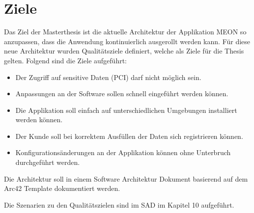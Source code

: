 \chapter{Ziele}

Das Ziel der Masterthesis ist die aktuelle Architektur der Applikation MEON so anzupassen, dass die Anwendung kontinuierlich ausgerollt werden kann. Für diese neue Architektur wurden Qualitätsziele definiert, welche als Ziele für die Thesis gelten. Folgend sind die Ziele aufgeführt:

\begin{itemize}
	\item Der Zugriff auf sensitive Daten (PCI) darf nicht möglich sein.
	\item Anpassungen an der Software sollen schnell eingeführt werden können.
	\item Die Applikation soll einfach auf unterschiedlichen Umgebungen installiert werden können.
	\item Der Kunde soll bei korrektem Ausfüllen der Daten sich registrieren können.
	\item Konfigurationsänderungen an der Applikation können ohne Unterbruch durchgeführt werden.
\end{itemize}

Die Architektur soll in einem Software Architektur Dokument basierend auf dem Arc42 Template dokumentiert werden.

Die Szenarien zu den Qualitätszielen sind im SAD im Kapitel 10 aufgeführt.
